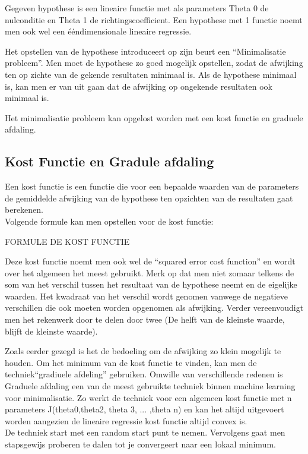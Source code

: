 Gegeven hypothese is een lineaire functie met als parameters Theta 0 de nulconditie en Theta 1 de richtingscoefficient. Een hypothese met 1 functie noemt men ook wel een ééndimensionale lineaire regressie.

\newline

Het opstellen van de hypothese introduceert op zijn beurt een ``Minimalisatie probleem''. Men moet de hypothese zo goed mogelijk opstellen, zodat de afwijking ten op zichte van de gekende resultaten minimaal is. Als de hypothese minimaal is, kan men er van uit gaan dat de afwijking op ongekende resultaten ook minimaal is.

Het minimalisatie probleem kan opgelost worden met een kost functie en graduele afdaling.

\subsection{Kost Functie en Gradule afdaling}\label{Kost Functie en Gradule afdaling}

Een kost functie is een functie die voor een bepaalde waarden van de parameters de gemiddelde afwijking van de hypothese ten opzichten van de resultaten gaat berekenen.
\\
Volgende formule kan men opstellen voor de kost functie:

\newline
FORMULE DE KOST FUNCTIE
\newline

Deze kost functie noemt men ook wel de ``squared error cost function'' en wordt over het algemeen het meest gebruikt. 
Merk op dat men niet zomaar telkens de som van het verschil tussen het resultaat van de hypothese neemt en de eigelijke waarden. Het kwadraat van het verschil wordt genomen vanwege de negatieve verschillen die ook moeten worden opgenomen als afwijking. Verder vereenvoudigt men het rekenwerk door te delen door twee (De helft van de kleinste waarde, blijft de kleinste waarde). 

Zoals eerder gezegd is het de bedoeling om de afwijking zo klein mogelijk te houden. Om het minimum van de kost functie te vinden, kan men de techniek``gradiuele afdeling'' gebruiken. Omwille van verschillende redenen is Graduele afdaling een van de meest gebruikte techniek binnen machine learning voor minimalisatie. Zo werkt de techniek voor een algemeen kost functie met n parameters J(theta0,theta2, theta 3, ... ,theta n) en kan het altijd uitgevoert worden aangezien de lineaire regressie kost functie altijd convex is.
\\
De techniek start met een random start punt te nemen. Vervolgens gaat men stapsgewijs proberen te dalen tot je convergeert naar een lokaal minimum.


